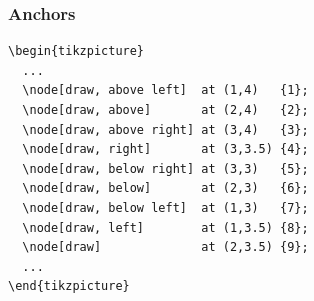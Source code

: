 \documentclass{article}
\begin{document}
\subsubsection*{Anchors}
\begin{minipage}[c]{0.7\textwidth}
\begin{lstlisting}
\begin{tikzpicture}
  ...
  \node[draw, above left]  at (1,4)   {1};
  \node[draw, above]       at (2,4)   {2};
  \node[draw, above right] at (3,4)   {3};
  \node[draw, right]       at (3,3.5) {4};
  \node[draw, below right] at (3,3)   {5};
  \node[draw, below]       at (2,3)   {6};
  \node[draw, below left]  at (1,3)   {7};
  \node[draw, left]        at (1,3.5) {8};
  \node[draw]              at (2,3.5) {9};
  ...
\end{tikzpicture}
\end{lstlisting}
\end{minipage}
\hfill
\end{document}
